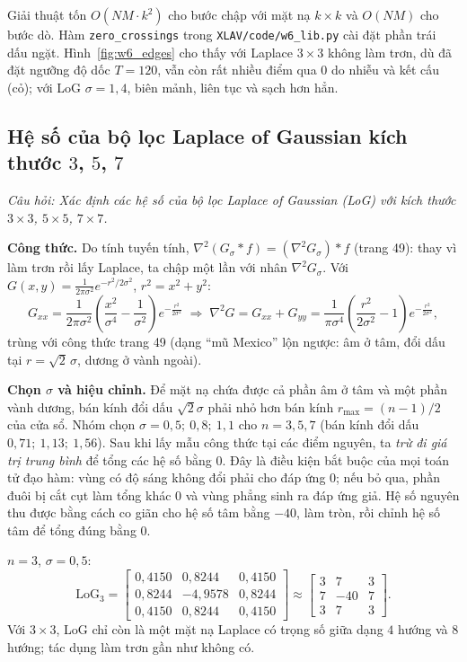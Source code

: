 Giải thuật tốn $O(NM \cdot k^2)$ cho bước chập với mặt nạ $k \times k$ và $O(NM)$ cho bước dò. Hàm \texttt{zero\_crossings} trong \texttt{XLAV/code/w6\_lib.py} cài đặt phần trái dấu ngặt. Hình~\ref{fig:w6_edges} cho thấy với Laplace $3 \times 3$ không làm trơn, dù đã đặt ngưỡng độ dốc $T = 120$, vẫn còn rất nhiều điểm qua $0$ do nhiễu và kết cấu (cỏ); với LoG $\sigma = 1{,}4$, biên mảnh, liên tục và sạch hơn hẳn.

\subsection{Hệ số của bộ lọc Laplace of Gaussian kích thước \texorpdfstring{$3$, $5$, $7$}{3, 5, 7}}
\label{subsec:w6_log_kernels}

\textit{Câu hỏi: Xác định các hệ số của bộ lọc Laplace of Gaussian (LoG) với kích thước $3 \times 3$, $5 \times 5$, $7 \times 7$.}

\textbf{Công thức.} Do tính tuyến tính, $\nabla^2(G_\sigma * f) = (\nabla^2 G_\sigma) * f$ (trang 49): thay vì làm trơn rồi lấy Laplace, ta chập một lần với nhân $\nabla^2 G_\sigma$. Với $G(x, y) = \frac{1}{2\pi\sigma^2}e^{-r^2/2\sigma^2}$, $r^2 = x^2 + y^2$:
\begin{equation}
G_{xx} = \frac{1}{2\pi\sigma^2}\left(\frac{x^2}{\sigma^4} - \frac{1}{\sigma^2}\right)e^{-\frac{r^2}{2\sigma^2}}
\;\Rightarrow\;
\nabla^2 G = G_{xx} + G_{yy} = \frac{1}{\pi\sigma^4}\left(\frac{r^2}{2\sigma^2} - 1\right)e^{-\frac{r^2}{2\sigma^2}},
\end{equation}
trùng với công thức trang 49 (dạng ``mũ Mexico'' lộn ngược: âm ở tâm, đổi dấu tại $r = \sqrt 2\,\sigma$, dương ở vành ngoài).

\textbf{Chọn $\sigma$ và hiệu chỉnh.} Để mặt nạ chứa được cả phần âm ở tâm và một phần vành dương, bán kính đổi dấu $\sqrt 2\sigma$ phải nhỏ hơn bán kính $r_{\max} = (n - 1)/2$ của cửa sổ. Nhóm chọn $\sigma = 0{,}5;\ 0{,}8;\ 1{,}1$ cho $n = 3, 5, 7$ (bán kính đổi dấu $0{,}71;\ 1{,}13;\ 1{,}56$). Sau khi lấy mẫu công thức tại các điểm nguyên, ta \emph{trừ đi giá trị trung bình} để tổng các hệ số bằng $0$. Đây là điều kiện bắt buộc của mọi toán tử đạo hàm: vùng có độ sáng không đổi phải cho đáp ứng $0$; nếu bỏ qua, phần đuôi bị cắt cụt làm tổng khác $0$ và vùng phẳng sinh ra đáp ứng giả. Hệ số nguyên thu được bằng cách co giãn cho hệ số tâm bằng $-40$, làm tròn, rồi chỉnh hệ số tâm để tổng đúng bằng $0$.

$n = 3$, $\sigma = 0{,}5$:
\[
\mathrm{LoG}_3 = \begin{bmatrix} 0{,}4150 & 0{,}8244 & 0{,}4150 \\ 0{,}8244 & -4{,}9578 & 0{,}8244 \\ 0{,}4150 & 0{,}8244 & 0{,}4150 \end{bmatrix}
\approx \begin{bmatrix} 3 & 7 & 3 \\ 7 & -40 & 7 \\ 3 & 7 & 3 \end{bmatrix}.
\]
Với $3 \times 3$, LoG chỉ còn là một mặt nạ Laplace có trọng số giữa dạng $4$ hướng và $8$ hướng; tác dụng làm trơn gần như không có.

